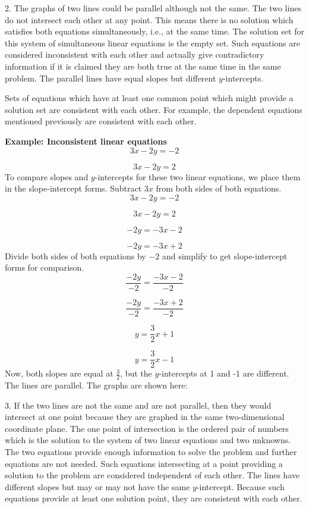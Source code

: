 2. The graphs of two lines could be parallel although not the same. The two lines do not intersect each other at any point. This means there is no solution which satisfies both equations simultaneously, i.e., at the same time. The solution set for this system of simultaneous linear equations is the empty set. Such equations are considered inconsistent with each other and actually give contradictory information if it is claimed they are both true at the same time in the same problem. The parallel lines have equal slopes but different $y$-intercepts.

Sets of equations which have at least one common point which might provide a solution set
are consistent with each other. For example, the dependent equations mentioned previously
are consistent with each other.

\textbf{Example: Inconsistent linear equations}
\[
3x - 2y = -2
\]

\[
3x - 2y = 2
\]
To compare slopes and $y$-intercepts for these two linear equations, we place them in the slope-intercept forms. Subtract $3x$ from both sides of both equations.
\[
3x - 2y = -2
\]

\[
3x - 2y = 2
\]

\[
-2y = -3x - 2
\]

\[
-2y = -3x + 2
\]
Divide both sides of both equations by $-2$ and simplify to get slope-intercept forms for comparison.
\[
\frac{-2y}{-2} = \frac{-3x - 2}{-2}
\]

\[
\frac{-2y}{-2} = \frac{-3x + 2}{-2}
\]

\[
y = \frac{3}{2}x + 1
\]

\[
y = \frac{3}{2}x - 1
\]
Now, both slopes are equal at $\frac{3}{2}$, but the $y$-intercepts at 1 and -1 are different. The lines are parallel. The graphs are shown here:


3. If the two lines are not the same and are not parallel, then they would intersect at one point because they are graphed in the same two-dimensional coordinate plane. The one point of intersection is the ordered pair of numbers which is the solution to the system of two linear equations and two unknowns. The two equations provide enough information to solve the problem and further equations are not needed. Such equations intersecting at a point providing a solution to the problem are considered independent of each other. The lines have different slopes but may or may not have the same $y$-intercept. Because such equations provide at least one solution point, they are consistent with each other.

